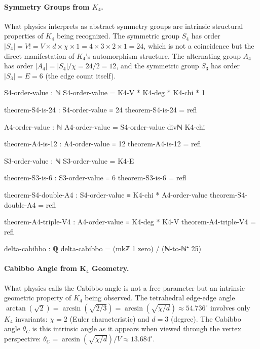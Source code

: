 \documentclass[11pt,a4paper]{book}
\begin{document}
\paragraph{Symmetry Groups from $K_4$.}
What physics interprets as abstract symmetry groups are intrinsic structural properties of $K_4$ being recognized. The symmetric group $S_4$ has order $|S_4| = V! = V \times d \times \chi \times 1 = 4 \times 3 \times 2 \times 1 = 24$, which is not a coincidence but the direct manifestation of $K_4$'s automorphism structure. The alternating group $A_4$ has order $|A_4| = |S_4|/\chi = 24/2 = 12$, and the symmetric group $S_3$ has order $|S_3| = E = 6$ (the edge count itself).

\begin{code}
S4-order-value : ℕ
S4-order-value = K4-V * K4-deg * K4-chi * 1

theorem-S4-is-24 : S4-order-value ≡ 24
theorem-S4-is-24 = refl

A4-order-value : ℕ
A4-order-value = S4-order-value divℕ K4-chi

theorem-A4-is-12 : A4-order-value ≡ 12
theorem-A4-is-12 = refl

S3-order-value : ℕ
S3-order-value = K4-E

theorem-S3-is-6 : S3-order-value ≡ 6
theorem-S3-is-6 = refl

theorem-S4-double-A4 : S4-order-value ≡ K4-chi * A4-order-value
theorem-S4-double-A4 = refl

theorem-A4-triple-V4 : A4-order-value ≡ K4-deg * K4-V
theorem-A4-triple-V4 = refl
\end{code}

\begin{code}
delta-cabibbo : ℚ
delta-cabibbo = (mkℤ 1 zero) / (ℕ-to-ℕ⁺ 25)
\end{code}

\paragraph{Cabibbo Angle from K$_4$ Geometry.}
What physics calls the Cabibbo angle is not a free parameter but an intrinsic geometric property of $K_4$ being observed. The tetrahedral edge-edge angle $\arctan(\sqrt{2}) = \arcsin(\sqrt{2/3}) = \arcsin(\sqrt{\chi/d}) \approx 54.736^\circ$ involves only $K_4$ invariants: $\chi = 2$ (Euler characteristic) and $d = 3$ (degree). The Cabibbo angle $\theta_C$ is this intrinsic angle as it appears when viewed through the vertex perspective: $\theta_C = \arcsin(\sqrt{\chi/d}) / V \approx 13.684^\circ$.
\end{document}
